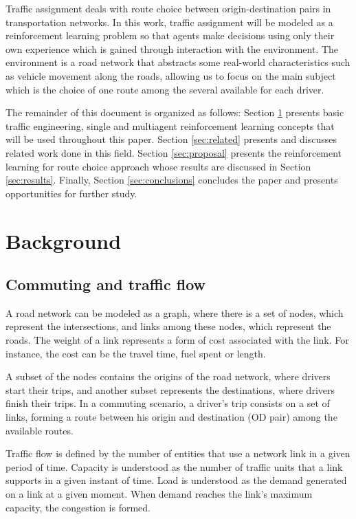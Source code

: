 \documentclass{RITA}
\begin{document}
Traffic assignment deals with route choice between origin-destination pairs in transportation networks. In this work, traffic assignment will be modeled as a reinforcement learning problem so that agents make decisions using only their own experience which is gained through interaction with the environment. The environment is a road network that abstracts some real-world characteristics such as vehicle movement along the roads, allowing us to focus on the main subject which is the choice of one route among the several available for each driver.

The remainder of this document is organized as follows: Section \ref{sec:concepts} presents basic traffic engineering, single and multiagent reinforcement learning concepts that will be used throughout this paper. Section \ref{sec:related} presents and discusses related work done in this field. Section \ref{sec:proposal} presents the reinforcement learning for route choice approach whose results are discussed in Section \ref{sec:results}. Finally, Section \ref{sec:conclusions} concludes the paper and presents opportunities for further study.

\section{Background}
\label{sec:concepts}
\subsection{Commuting and traffic flow}

A road network can be modeled as a graph, where there is a set of nodes, which represent the intersections, and links among these nodes, which represent the roads. The weight of a link represents a form of cost associated with the link. For instance, the cost can be the travel time, fuel spent or length.

A subset of the nodes contains the origins of the road network, where drivers start their trips, and another subset represents the destinations, where drivers finish their trips. In a commuting scenario, a driver's trip consists on a set of links, forming a route between his origin and destination (OD pair) among the available routes.

Traffic flow is defined by the number of entities that use a network link in a given period of time. Capacity is understood as the number of traffic units that a link supports in a given instant of time. Load is understood as the demand generated on a link at a given moment. When demand reaches the link's maximum capacity, the congestion is formed.
\end{document}

